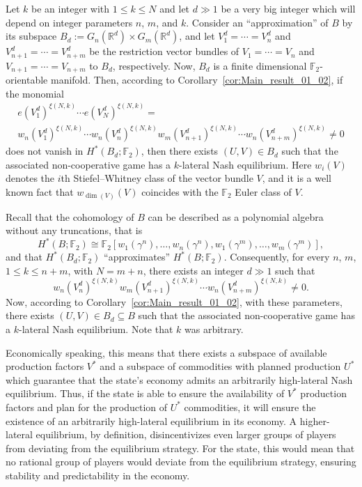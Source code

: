 \documentclass[a4paper,11pt,reqno,english]{amsart}
\theoremstyle{plain}
\theoremstyle{definition}
\begin{document}
\medskip
Let $k$ be an integer with $1\leq k\leq N$ and let $d\gg 1$ be a very big integer which will depend on integer parameters $n$, $m$, and $k$.
Consider an ``approximation'' of $B$ by its subspace $B_d:=G_n(\mathbb{R}^{d})\times G_m(\mathbb{R}^{d})$, and let $V_1^d=\cdots=V_n^d$ and $V_{n+1}^d=\cdots=V_{n+m}^d$ be the restriction vector bundles of $V_1=\cdots=V_n$ and $V_{n+1}=\cdots=V_{n+m}$ to $B_d$, respectively.
Now, $B_d$ is a finite dimensional $\mathbb{F}_2$-orientable manifold.
Then, according to Corollary~\ref{cor:Main_result_01_02}, if the monomial
\begin{multline*}
	e(V_1^d)^{\xi(N,k)}\cdots e(V_N^d)^{\xi(N,k)}= \\ w_n(V_1^d)^{\xi(N,k)}\cdots w_n(V_n^d)^{\xi(N,k)}w_m(V_{n+1}^d)^{\xi(N,k)}\cdots w_n(V_{n+m}^d)^{\xi(N,k)}\neq 0
\end{multline*}
does not vanish in $H^*(B_d;\mathbb{F}_2)$, then there exists $(U,V)\in B_d$ such that the associated non-cooperative game has a $k$-lateral Nash equilibrium.
Here $w_i(V)$ denotes the $i$th Stiefel--Whitney class of the vector bundle $V$, and it is a well known fact that $w_{\dim(V)}(V)$ coincides with the $\mathbb{F}_2$ Euler class of $V$.

\medskip
Recall that the cohomology of $B$ can be described as a polynomial algebra without any truncations, that is
\[
	H^*(B;\mathbb{F}_2)\cong \mathbb{F}_2[w_1(\gamma^n),\dots, w_n(\gamma^n), w_1(\gamma^m),\dots, w_m(\gamma^m)],
\]
and that  $H^*(B_d;\mathbb{F}_2)$ ``approximates'' $H^*(B;\mathbb{F}_2)$.
Consequently, for every $n$, $m$, $1\leq k\leq n+m$, with $N=m+n$, there exists an integer $d\gg 1$ such that
\[
	w_n(V_n^d)^{\xi(N,k)}w_m(V_{n+1}^d)^{\xi(N,k)}\cdots w_n(V_{n+m}^d)^{\xi(N,k)}\neq 0.
\]
Now, according to Corollary~\ref{cor:Main_result_01_02}, with these parameters, there exists $(U,V)\in B_d\subseteq B$ such that the associated non-cooperative game has a $k$-lateral Nash equilibrium. Note that $k$ was arbitrary.

\medskip
Economically speaking, this means that there exists a subspace of available production factors $V^*$ and a subspace of commodities with planned production $U^*$ which guarantee that the state's economy admits an arbitrarily high-lateral Nash equilibrium.
Thus, if the state is able to ensure the availability of $V^*$ production factors and plan for the production of $U^*$ commodities, it will ensure the existence of an arbitrarily high-lateral equilibrium in its economy.
A higher-lateral equilibrium, by definition, disincentivizes even larger groups of players from deviating from the equilibrium strategy.
For the state, this would mean that no rational group of players would deviate from the equilibrium strategy, ensuring stability and predictability in the economy.
\end{document}
